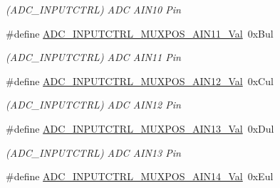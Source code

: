 \begin{DoxyCompactItemize}
\begin{DoxyCompactList}\small\item\em (A\+D\+C\+\_\+\+I\+N\+P\+U\+T\+C\+T\+R\+L) A\+D\+C A\+I\+N10 Pin \end{DoxyCompactList}\item 
\hypertarget{group___s_a_m_l21___a_d_c_ga0e221af1407d390a01a75b42e38b2e0c}{}\#define \hyperlink{group___s_a_m_l21___a_d_c_ga0e221af1407d390a01a75b42e38b2e0c}{A\+D\+C\+\_\+\+I\+N\+P\+U\+T\+C\+T\+R\+L\+\_\+\+M\+U\+X\+P\+O\+S\+\_\+\+A\+I\+N11\+\_\+\+Val}~0x\+Bul\label{group___s_a_m_l21___a_d_c_ga0e221af1407d390a01a75b42e38b2e0c}

\begin{DoxyCompactList}\small\item\em (A\+D\+C\+\_\+\+I\+N\+P\+U\+T\+C\+T\+R\+L) A\+D\+C A\+I\+N11 Pin \end{DoxyCompactList}\item 
\hypertarget{group___s_a_m_l21___a_d_c_ga458774096cef14109980fca96a7ceb66}{}\#define \hyperlink{group___s_a_m_l21___a_d_c_ga458774096cef14109980fca96a7ceb66}{A\+D\+C\+\_\+\+I\+N\+P\+U\+T\+C\+T\+R\+L\+\_\+\+M\+U\+X\+P\+O\+S\+\_\+\+A\+I\+N12\+\_\+\+Val}~0x\+Cul\label{group___s_a_m_l21___a_d_c_ga458774096cef14109980fca96a7ceb66}

\begin{DoxyCompactList}\small\item\em (A\+D\+C\+\_\+\+I\+N\+P\+U\+T\+C\+T\+R\+L) A\+D\+C A\+I\+N12 Pin \end{DoxyCompactList}\item 
\hypertarget{group___s_a_m_l21___a_d_c_ga152571a42b1857c123bf55d3204ac530}{}\#define \hyperlink{group___s_a_m_l21___a_d_c_ga152571a42b1857c123bf55d3204ac530}{A\+D\+C\+\_\+\+I\+N\+P\+U\+T\+C\+T\+R\+L\+\_\+\+M\+U\+X\+P\+O\+S\+\_\+\+A\+I\+N13\+\_\+\+Val}~0x\+Dul\label{group___s_a_m_l21___a_d_c_ga152571a42b1857c123bf55d3204ac530}

\begin{DoxyCompactList}\small\item\em (A\+D\+C\+\_\+\+I\+N\+P\+U\+T\+C\+T\+R\+L) A\+D\+C A\+I\+N13 Pin \end{DoxyCompactList}\item 
\hypertarget{group___s_a_m_l21___a_d_c_ga6ca65f998850d5f1f86cf8edbc3b4d31}{}\#define \hyperlink{group___s_a_m_l21___a_d_c_ga6ca65f998850d5f1f86cf8edbc3b4d31}{A\+D\+C\+\_\+\+I\+N\+P\+U\+T\+C\+T\+R\+L\+\_\+\+M\+U\+X\+P\+O\+S\+\_\+\+A\+I\+N14\+\_\+\+Val}~0x\+Eul\label{group___s_a_m_l21___a_d_c_ga6ca65f998850d5f1f86cf8edbc3b4d31}


\end{DoxyCompactItemize}
